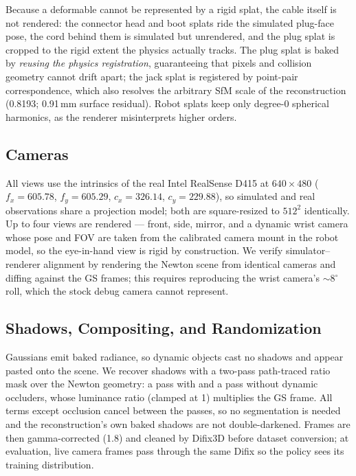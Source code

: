 Because a deformable cannot be represented by a rigid splat, the
cable itself is not rendered: the connector head and boot splats
ride the simulated plug-face pose, the cord behind them is simulated
but unrendered, and the plug splat is cropped to the rigid extent
the physics actually tracks. The plug splat is baked by
\emph{reusing the physics registration}, guaranteeing that pixels
and collision geometry cannot drift apart; the jack splat is
registered by point-pair correspondence, which also resolves the
arbitrary SfM scale of the reconstruction (0.8193; 0.91\,mm surface
residual). Robot splats keep only degree-0 spherical harmonics, as
the renderer misinterprets higher orders.

\subsection{Cameras}

All views use the intrinsics of the real Intel RealSense D415 at
$640\times480$ ($f_x{=}605.78$, $f_y{=}605.29$, $c_x{=}326.14$,
$c_y{=}229.88$), so simulated and real observations share a
projection model; both are square-resized to $512^2$ identically. Up
to four views are rendered --- front, side, mirror, and a dynamic
wrist camera whose pose and FOV are taken from the calibrated camera
mount in the robot model, so the eye-in-hand view is rigid by
construction. We
verify simulator--renderer alignment by rendering the Newton scene
from identical cameras and diffing against the GS frames; this
requires reproducing the wrist camera's $\sim$8$^{\circ}$ roll,
which the stock debug camera cannot represent.

\subsection{Shadows, Compositing, and Randomization}

Gaussians emit baked radiance, so dynamic objects cast no shadows
and appear pasted onto the scene. We recover shadows with a two-pass
path-traced ratio mask over the Newton geometry: a pass with and a
pass without dynamic occluders, whose luminance ratio (clamped at 1)
multiplies the GS frame. All terms except occlusion cancel between
the passes, so no segmentation is needed and the reconstruction's
own baked shadows are not double-darkened. Frames are then
gamma-corrected (1.8) and cleaned by Difix3D before dataset
conversion; at evaluation, live camera frames pass through the same
Difix so the policy sees its training distribution.

